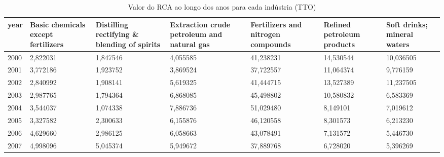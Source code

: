 \begin{table}
\centering
\caption{Valor do RCA ao longo dos anos para cada indústria (TTO)}
\begin{tabular}{p{1cm}p{2cm}p{2cm}p{2cm}p{2cm}p{2cm}p{2cm}}
\toprule
 year &  Basic chemicals except fertilizers &  Distilling rectifying \& blending of spirits &  Extraction crude petroleum and natural gas &  Fertilizers and nitrogen compounds &  Refined petroleum products &  Soft drinks; mineral waters \\
\midrule
 2000 &                            2,822031 &                                     1,847546 &                                    4,055585 &                           41,238231 &                   14,530544 &                    10,036505 \\
 2001 &                            3,772186 &                                     1,923752 &                                    3,869524 &                           37,722557 &                   11,064374 &                     9,776159 \\
 2002 &                            2,840992 &                                     1,908141 &                                    5,619325 &                           41,444715 &                   13,527389 &                    11,237505 \\
 2003 &                            2,987765 &                                     1,794364 &                                    6,868085 &                           45,498802 &                   10,580832 &                     6,583369 \\
 2004 &                            3,544037 &                                     1,074338 &                                    7,886736 &                           51,029480 &                    8,149101 &                     7,019612 \\
 2005 &                            3,327582 &                                     2,300633 &                                    6,155876 &                           46,120558 &                    8,301573 &                     6,213230 \\
 2006 &                            4,629660 &                                     2,986125 &                                    6,058663 &                           43,078491 &                    7,131572 &                     5,446730 \\
 2007 &                            4,998096 &                                     5,045374 &                                    5,949672 &                           37,889768 &                    6,728020 &                     5,396269 \\

\end{tabular}
\end{table}
